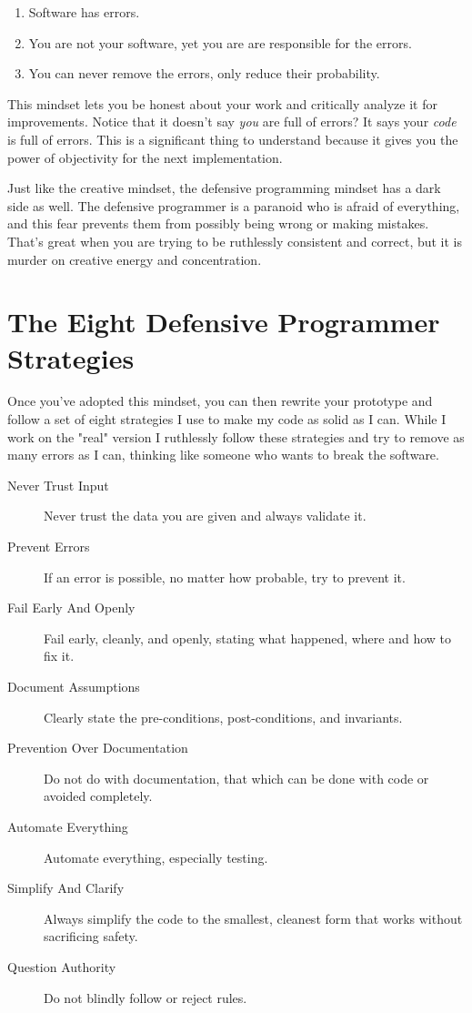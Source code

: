 \begin{enumerate}
\item Software has errors.
\item You are not your software, yet you are are responsible for the errors.
\item You can never remove the errors, only reduce their probability.
\end{enumerate}

This mindset lets you be honest about your work and critically analyze it 
for improvements.  Notice that it doesn't say \emph{you} are full of errors?
It says your \emph{code} is full of errors.  This is a significant thing to
understand because it gives you the power of objectivity for the next
implementation.

Just like the creative mindset, the defensive programming mindset has a
dark side as well.  The defensive programmer is a paranoid who is afraid
of everything, and this fear prevents them from possibly being wrong or
making mistakes.  That's great when you are trying to be ruthlessly
consistent and correct, but it is murder on creative energy and 
concentration.


\section{The Eight Defensive Programmer Strategies}

Once you've adopted this mindset, you can then rewrite your prototype and follow
a set of eight strategies I use to make my code as solid as I can.  While I work
on the "real" version I ruthlessly follow these strategies and try to remove
as many errors as I can, thinking like someone who wants to break the software.


\begin{description}
\item[Never Trust Input] Never trust the data you are given and always validate it.
\item[Prevent Errors] If an error is possible, no matter how probable, try to prevent it.
\item[Fail Early And Openly] Fail early, cleanly, and openly, stating what happened, where and how to fix it.
\item[Document Assumptions] Clearly state the pre-conditions, post-conditions, and invariants.
\item[Prevention Over Documentation] Do not do with documentation, that which can be done with code or avoided completely.
\item[Automate Everything] Automate everything, especially testing.
\item[Simplify And Clarify] Always simplify the code to the smallest, cleanest form that works without sacrificing safety.
\item[Question Authority] Do not blindly follow or reject rules.
\end{description}

